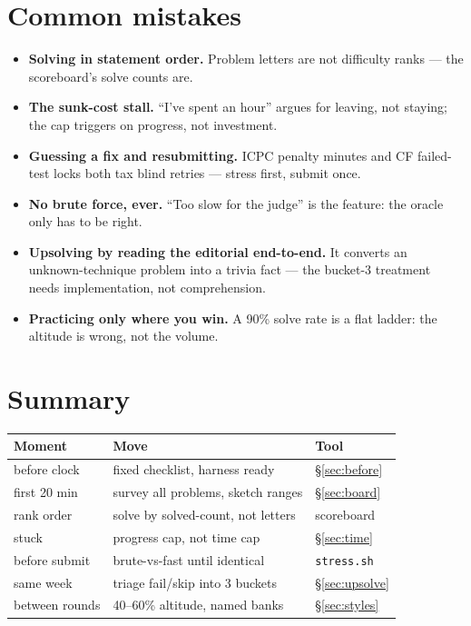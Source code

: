 \section{Common mistakes}
\begin{itemize}
\item \textbf{Solving in statement order.} Problem letters are
not difficulty ranks --- the scoreboard's solve counts are.
\item \textbf{The sunk-cost stall.} ``I've spent an hour''
argues for leaving, not staying; the cap triggers on
progress, not investment.
\item \textbf{Guessing a fix and resubmitting.} ICPC penalty
minutes and CF failed-test locks both tax blind retries ---
stress first, submit once.
\item \textbf{No brute force, ever.} ``Too slow for the
judge'' is the feature: the oracle only has to be right.
\item \textbf{Upsolving by reading the editorial end-to-end.}
It converts an unknown-technique problem into a trivia fact
--- the bucket-3 treatment needs implementation, not
comprehension.
\item \textbf{Practicing only where you win.} A 90\% solve
rate is a flat ladder: the altitude is wrong, not the volume.
\end{itemize}

\section*{Summary}
\begin{tabularx}{\linewidth}{@{}lXl@{}}
\textbf{Moment} & \textbf{Move} & \textbf{Tool}\\
\midrule
before clock & fixed checklist, harness ready & \S\ref{sec:before}\\
first 20 min & survey all problems, sketch ranges & \S\ref{sec:board}\\
rank order & solve by solved-count, not letters & scoreboard\\
stuck & progress cap, not time cap & \S\ref{sec:time}\\
before submit & brute-vs-fast until identical & \texttt{stress.sh}\\
same week & triage fail/skip into 3 buckets & \S\ref{sec:upsolve}\\
between rounds & 40--60\% altitude, named banks & \S\ref{sec:styles}\\
\end{tabularx}

